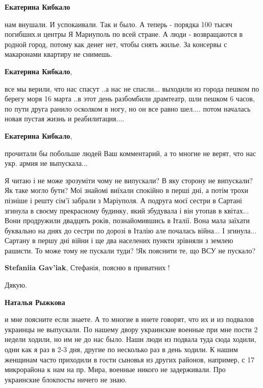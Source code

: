 \begin{itemize} %
\textbf{Екатерина Кибкало} 

нам внушали. И успокаивали. Так и было. А теперь - порядка 100 тысяч погибших.и
центры Я Мариуполь по всей стране. А люди - возвращаются в родной город, потому
как денег нет, чтобы снять жилье. За консервы с макаронами квартиру не снимешь.

\textbf{Екатерина Кибкало},

все мы верили, что нас спасут ..а нас не спасли... выходили из города пешком по
берегу моря 16 марта ..в этот день разбомбили драмтеатр, шли пешком 6 часов, по
пути друга ранило осколком в ногу, но он все равно шел.... потом началась новая
пустая жизнь и реабилитация....

\textbf{Екатерина Кибкало},

прочитали бы побольше людей Ваш комментарий, а то многие не верят, что нас укр. армия не выпускала...


Я читаю і не може зрозуміти чому не випускали? В яку сторону не випускали? Як
таке могло бути? Мої знайомі виїхали спокійно в перші дні, а потім трохи
пізніше і решту сім'ї забрали з Маріуполя. А подруга моєї сестри в Сартані
згинула в своєму прекрасному будинку, який збудувала і він утопав в
квітах... Вони продружили двадцять років, познайомившись в Італії. Вона мала
заїхати буквально на днях до сестри по дорозі в Італію але почалась війна... І
згинула... Сартану в першу дні війни і ще два населених пункти зрівняли з землею
рашисти. То може тому не пускали туди? !Як пояснити те, що ВСУ не пускало?

\textbf{Stefaniia Gav'iak}, Стефанія, поясню в приватних !


Дякую.

\textbf{Наталья Рыжкова} 

и мне поясните если знаете. А то многие в инете говорят, что их и из подвалов
украинцы не выпускали. По нашему двору украинские военные при мне пости 2
недели ходили, но им не до нас было. Наши люди из подвала туда сюда ходили,
одни как я раз в 2-3 дня, другие по несколько раз в день ходили. К нашим
женщинам часто приходили в гости сыновья из других районов, например, с 17
микрорайона к нам на пр. Мира, военные никого не задерживали. Про украинские
блокпосты ничего не знаю.

\end{itemize} %

